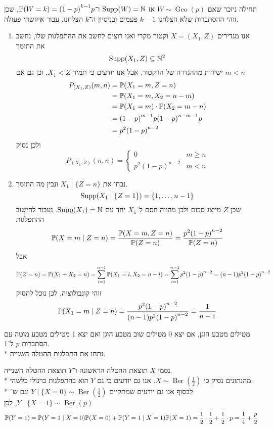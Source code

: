 \begin{solution}
	תחילה ניזכר שאם $W \sim \operatorname{Geo}(p)$ אז $\operatorname{Supp}(W) = \mathbb{N}$ ו־$\mathbb{P}(W = k) = {(1 - p)}^{k - 1} p$, שכן זוהי ההסתברות שלא הצלחנו $k - 1$ פעמים ובניסיון ה־$k$ הצלחנו, עבור איזושהי פעולה.
	\begin{enumerate}
		\item אנו מגדירים $X = (X_1, Z)$ וקטור מקרי ואנו רוצים לחשב את ההתפלגות שלו, נחשב את התומך
			\[
				\operatorname{Supp}(X_1, Z) \subseteq \mathbb{N}^2
			\]
			ישירות מההגדרה של הווקטור, אבל אנו יודעים כי תמיד $X_1 < Z$, וכן גם אם $m < n$
			\begin{align*}
				P_{(X_1, Z)}(m, n)
				& = \mathbb{P}(X_1 = m, Z = n) \\
				& = \mathbb{P}(X_1 = m, X_2 = n - m) \\
				& = \mathbb{P}(X_1 = m) \cdot \mathbb{P}(X_2 = m - n) \\
				& = {(1 - p)}^{m - 1} p {(1 - p)}^{n - m - 1} p \\
				& = p^2 {(1 - p)}^{n - 2}
			\end{align*}
			ולכן נסיק
			\[
				P_{(X_1, Z)}(n, n) = \begin{cases}
					0 & m \ge n \\
					p^2 {(1 - p)}^{n - 2} & m < n
				\end{cases}
			\]
		\item נבחן את $X_1 \mid \{ Z = n\}$ ונבין מה התומך.
			\[
				\operatorname{Supp}(X_1 \mid \{Z = 1\})
				= \{1, \dots, n - 1\}
			\]
			שכן $Z$ מייצג סכום ולכן מהווה חסם ל־$X_1$ יחד עם $\operatorname{Supp}(X_1) = \mathbb{N}$. נעבור לחישוב ההתפלגות
			\[
				\mathbb{P}(X = m \mid Z = n)
				= \frac{\mathbb{P}(X = m, Z = n)}{\mathbb{P}(Z = n)}
				= \frac{p^2 {(1 - p)}^{n - 2}}{\mathbb{P}(Z = n)}
			\]
			אבל
			\[
				\mathbb{P}(Z = n)
				= \mathbb{P}(X_1 + X_2 = n)
				= \sum_{i = 1}^{n - 1}  \mathbb{P}(X_1 = i, X_2 = n - i)
				= \sum_{i = 1}^{n - 1}  p^2 {(1 - p)}^{n - 2}
				= (n - 1) p^2 {(1 - p)}^{n - 2}
			\]
			זוהי קונבולוציה, לכן נוכל להסיק
			\[
				\mathbb{P}(X_1 = m \mid Z = n)
				= \frac{p^2 {(1 - p)}^{n - 2}}{(n - 1) p^2 {(1 - p)}^{n - 2}}
				= \frac{1}{n - 1}
			\]
	\end{enumerate}
\end{solution}
\begin{exercise}
	מטילים מטבע הוגן, אם יצא 0 מטילים שוב מטבע הוגן ואם יצא 1 מטילים מטבע מוטה עם הסתברות $p$ ל־1. \\*
	נתחו את התפלגות ההטלה השנייה.
\end{exercise}
\begin{solution}
	נסמן $X$ תוצאת ההטלה הראשונה ו־$Y$ תוצאת ההטלה השנייה. \\*
	מהנתונים נסיק כי $X \sim \operatorname{Ber}(\frac{1}{2})$. אנו גם יודעים כי גם $Y$ הוא בהתפלגות ברנולי כלשהי. \\*
	לבסוף אנו גם יודעים שמתקיים $Y \mid \{X = 0\} \sim \operatorname{Ber}(\frac{1}{2})$ וגם ש־$Y \mid \{X = 1\} \sim \operatorname{Ber}(p)$, לכן
	\[
		\mathbb{P}(Y = 1)
		= \mathbb{P}(Y = 1 \mid X = 0) \mathbb{P}(X = 0) + \mathbb{P}(Y = 1 \mid X = 1) \mathbb{P}(X = 1)
		= \frac{1}{2} \cdot \frac{1}{2} + \frac{1}{2} \cdot p
		= \frac{1}{4} + \frac{p}{2}
	\]
\end{solution}
